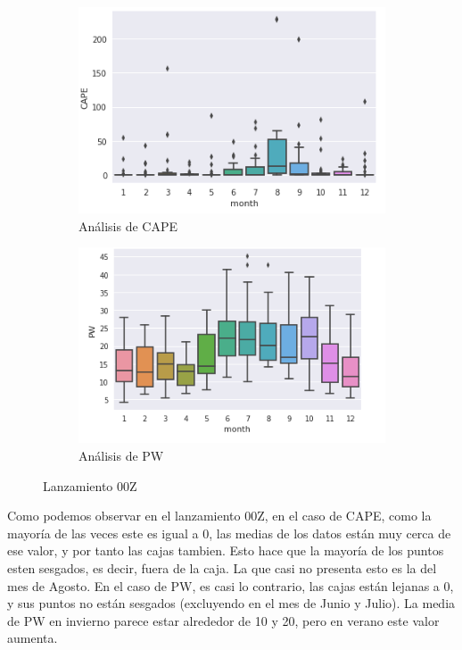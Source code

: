 \documentclass[12pt]{article}
\begin{document}
\begin{figure}[h!]
\begin{subfigure}{.55\textwidth}
  \centering
  \includegraphics[width=.8\linewidth]{CAPE_mes_00Z.png}
  \caption{Análisis de CAPE}
  \label{fig:sfig1}
\end{subfigure}
\begin{subfigure}{.57\textwidth}
  \centering
  \includegraphics[width=.8\linewidth]{PW_mes_00Z.png}
  \caption{Análisis de PW}
  \label{fig:sfig2}
\end{subfigure}
\caption{Lanzamiento 00Z}
\end{figure}

Como podemos observar en el lanzamiento 00Z, en el caso de CAPE, como la mayoría de las veces este es igual a 0, las medias de los datos están muy cerca de ese valor, y por tanto las cajas tambien. Esto hace que la mayoría de los puntos esten sesgados, es decir, fuera de la caja. La que casi no presenta esto es la del mes de Agosto. En el caso de PW, es casi lo contrario, las cajas están lejanas a 0, y sus puntos no están sesgados (excluyendo en el mes de Junio y Julio). La media de PW en invierno parece estar alrededor de 10 y 20, pero en verano este valor aumenta. 
\end{document}
